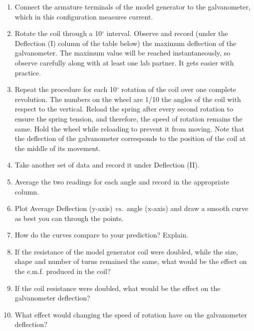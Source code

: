 \begin{enumerate}
\item Connect the armature terminals of the model generator to the galvanometer,
which in this configuration measures current.
\item Rotate the coil through a 10$^\circ$ interval. Observe and record
(under the Deflection (I) column of the table below) the maximum deflection
of the galvanometer. The maximum value will be reached instantaneously,
so observe carefully along with at least one lab partner. It gets
easier with practice.
\item Repeat the procedure for each 10$^\circ$ rotation of the coil over
one complete revolution. The numbers on the wheel are 1/10 the angles
of the coil with respect to the vertical. Reload the spring after
every second rotation to ensure the spring tension, and therefore,
the speed of rotation remains the same. Hold the wheel while reloading
to prevent it from moving. Note that the deflection of the galvanometer
corresponds to the position of the coil at the middle of its movement.
\item Take another set of data and record it under Deflection (II).
\item Average the two readings for each angle and record in the appropriate
column.
\item Plot Average Deflection (y-axis) \textit{vs.}~angle (x-axis) and draw a smooth
curve as best you can through the points.
\item How do the curves compare to your prediction? Explain.\vspace{15mm}

\item If the resistance of the model generator coil were doubled, while
the size, shape and number of turns remained the same, what would
be the effect on the e.m.f. produced in the coil?\vspace{15mm}

\item If the coil resistance were doubled, what would be the effect on the
galvanometer deflection?\vspace{15mm}

\item What effect would changing the speed of rotation have on the galvanometer
deflection?\vspace{15mm}

\end{enumerate}

